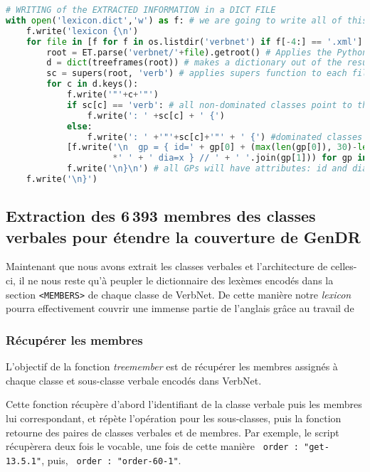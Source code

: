 \begin{lstlisting}[language=Python, caption = Importation de l'architecture des classes verbales, label=fig:archivn]
# WRITING of the EXTRACTED INFORMATION in a DICT FILE
with open('lexicon.dict','w') as f: # we are going to write all of this block into lexicon.dict
    f.write('lexicon {\n')
    for file in [f for f in os.listdir('verbnet') if f[-4:] == '.xml']: # open VerbNet XMl files
        root = ET.parse('verbnet/'+file).getroot() # Applies the Python Element Tree module
        d = dict(treeframes(root)) # makes a dictionary out of the results of treeframes on a file
        sc = supers(root, 'verb') # applies supers function to each file
        for c in d.keys():
            f.write('"'+c+'"')
            if sc[c] == 'verb': # all non-dominated classes point to the default verb class
                f.write(': ' +sc[c] + ' {') 
            else:
                f.write(': ' +'"'+sc[c]+'"' + ' {') #dominated classes point towards their governor
            [f.write('\n  gp = { id=' + gp[0] + (max(len(gp[0]), 30)-len(gp[0]))
                     *' ' + ' dia=x } // ' + ' '.join(gp[1])) for gp in d[c]]
            f.write('\n}\n') # all GPs will have attributes: id and dia
    f.write('\n}')
\end{lstlisting}

\subsection{Extraction des 6\,393 membres des classes verbales pour étendre la couverture de GenDR} \label{extracmembre}

Maintenant que nous avons extrait les classes verbales et l'architecture de celles-ci, il ne nous reste qu'à peupler le dictionnaire des lexèmes encodés dans la section \texttt{<MEMBERS>} de chaque classe de VerbNet. De cette manière notre \emph{lexicon} pourra effectivement couvrir une immense partie de l'anglais grâce au travail de %

\subsubsection{Récupérer les membres}
L'objectif de la fonction \emph{treemember} est de récupérer les membres assignés à chaque classe et sous-classe verbale encodés dans VerbNet.

Cette fonction récupère d'abord l'identifiant de la classe verbale puis les membres lui correspondant, et répète l'opération pour les sous-classes, puis la fonction retourne des paires de classes verbales et de membres. Par exemple, le script récupèrera deux fois le vocable, une fois de cette manière \lstinline| order : "get-13.5.1"|, puis, \lstinline| order : "order-60-1"|.


